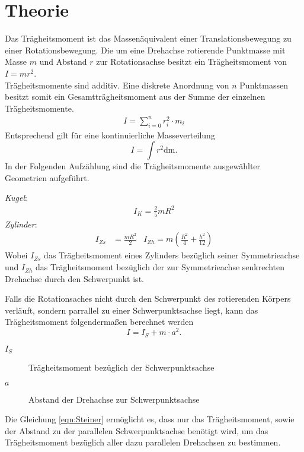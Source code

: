 \documentclass[parskip=half, bibliography=totoc]{scrartcl}
\begin{document}
\section{Theorie}
Das Trägheitsmoment ist das Massenäquivalent einer Translationsbewegung zu einer Rotationsbewegung. Die um eine Drehachse rotierende Punktmasse mit Masse $m$ und Abstand $r$ zur Rotationsachse besitzt ein Trägheitsmoment von $I = mr^2$.\\
Trägheitsmomente sind additiv.
Eine diskrete Anordnung von $n$ Punktmassen besitzt somit ein Gesamtträgheitsmoment aus der Summe der einzelnen Trägheitsmomente.
\begin{align*}
  I= \sum_{i = 0}^n r_i^2\cdot m_i
\end{align*}
Entsprechend gilt für eine kontinuierliche Masseverteilung
\begin{equation}
  \label{eqn:Trägheitsmoment}
  I = \int r^2 \mathup{dm}.
\end{equation}
In der Folgenden Aufzählung sind die Trägheitsmomente ausgewählter Geometrien aufgeführt.

\emph{Kugel}:
\begin{align*}
  I_K = \frac{2}{5}mR^2
\end{align*}
\emph{Zylinder}:
\begin{align*}
  I_{Zs} &= \frac{mR^2}{2} &
  I_{Zh} = m(\frac{R^2}{4} + \frac{h^2}{12})
\end{align*}
Wobei $I_{Zs}$ das Trägheitsmoment eines Zylinders bezüglich seiner Symmetrieachse und $I_{Zh}$ das Trägheitsmoment bezüglich der zur Symmetrieachse senkrechten Drehachse durch den Schwerpunkt ist.

Falls die Rotationsaches nicht durch den Schwerpunkt des rotierenden Körpers verläuft, sondern parrallel zu einer Schwerpunktsachse liegt, kann das Trägheitsmoment folgendermaßen berechnet werden
\begin{equation}
  \label{eqn:Steiner}
  I = I_S + m\cdot a^2.
\end{equation}
\begin{description}
  \item[$I_S$]Trägheitsmoment bezüglich der Schwerpunktsachse
  \item[$a$]Abstand der Drehachse zur Schwerpunktsachse
\end{description}
Die Gleichung \eqref{eqn:Steiner} ermöglicht es, dass nur das Trägheitsmoment, sowie der Abstand zu der parallelen Schwerpunktsachse benötigt wird, um das Trägheitsmoment bezüglich aller dazu parallelen Drehachsen zu bestimmen.
\end{document}
